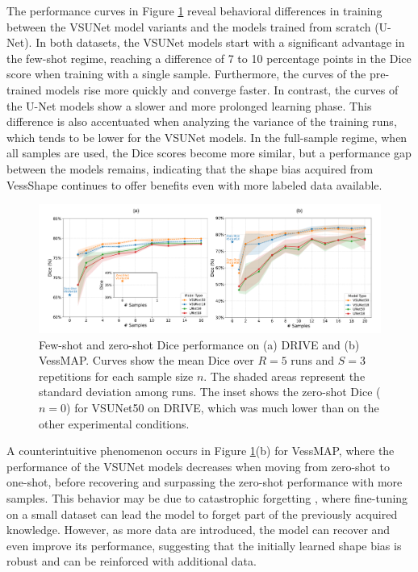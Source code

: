 \documentclass[%
reprint,
nofootinbib,
 amsmath,amssymb,
aps,
superscriptaddress,
showkeys,
longbibliography
]{revtex4-1}
\begin{document}
The performance curves in Figure \ref{f:results_charts} reveal behavioral differences in training between the VSUNet model variants and the models trained from scratch (U-Net). In both datasets, the VSUNet models start with a significant advantage in the few-shot regime, reaching a difference of 7 to 10 percentage points in the Dice score when training with a single sample. Furthermore, the curves of the pre-trained models rise more quickly and converge faster. In contrast, the curves of the U-Net models show a slower and more prolonged learning phase. This difference is also accentuated when analyzing the variance of the training runs, which tends to be lower for the VSUNet models. In the full-sample regime, when all samples are used, the Dice scores become more similar, but a performance gap between the models remains, indicating that the shape bias acquired from VessShape continues to offer benefits even with more labeled data available.

\begin{figure}[tbp]
    \centering
    \includegraphics[width=\textwidth]{figures/results/results_charts.pdf}
    \caption{Few-shot and zero-shot Dice performance on (a) DRIVE and (b) VessMAP. Curves show the mean Dice over $R{=}5$ runs and $S{=}3$ repetitions for each sample size $n$. The shaded areas represent the standard deviation among runs. The inset shows the zero-shot Dice ($n{=}0$) for VSUNet50 on DRIVE, which was much lower than on the other experimental conditions.}
    \label{f:results_charts}
\end{figure}

A counterintuitive phenomenon occurs in Figure \ref{f:results_charts}(b) for VessMAP, where the performance of the VSUNet models decreases when moving from zero-shot to one-shot, before recovering and surpassing the zero-shot performance with more samples. This behavior may be due to catastrophic forgetting \cite{MCCLOSKEY1989109}, where fine-tuning on a small dataset can lead the model to forget part of the previously acquired knowledge. However, as more data are introduced, the model can recover and even improve its performance, suggesting that the initially learned shape bias is robust and can be reinforced with additional data.
\end{document}

